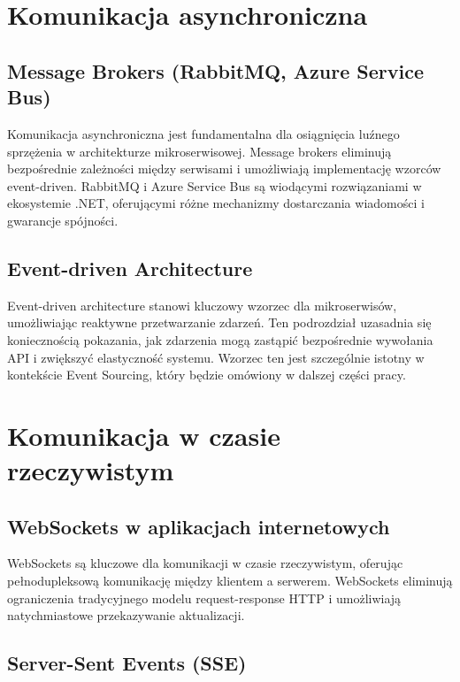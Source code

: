 \section{Komunikacja asynchroniczna}
\label{sec:KomunikacjaAsynchroniczna}

\subsection{Message Brokers (RabbitMQ, Azure Service Bus)}
\label{subsec:MessageBrokers}

Komunikacja asynchroniczna jest fundamentalna dla osiągnięcia luźnego sprzężenia w architekturze mikroserwisowej. Message brokers eliminują bezpośrednie zależności między serwisami i umożliwiają implementację wzorców event-driven. RabbitMQ i Azure Service Bus są wiodącymi rozwiązaniami w ekosystemie .NET, oferującymi różne mechanizmy dostarczania wiadomości i gwarancje spójności.

\subsection{Event-driven Architecture}
\label{subsec:EventDrivenArchitecture}

Event-driven architecture stanowi kluczowy wzorzec dla mikroserwisów, umożliwiając reaktywne przetwarzanie zdarzeń. Ten podrozdział uzasadnia się koniecznością pokazania, jak zdarzenia mogą zastąpić bezpośrednie wywołania API i zwiększyć elastyczność systemu. Wzorzec ten jest szczególnie istotny w kontekście Event Sourcing, który będzie omówiony w dalszej części pracy.

\section{Komunikacja w czasie rzeczywistym}
\label{sec:KomunikacjaCzasRzeczywisty}

\subsection{WebSockets w aplikacjach internetowych}
\label{subsec:WebSockets}

WebSockets są kluczowe dla komunikacji w czasie rzeczywistym, oferując pełnodupleksową komunikację między klientem a serwerem. WebSockets eliminują ograniczenia tradycyjnego modelu request-response HTTP i umożliwiają natychmiastowe przekazywanie aktualizacji.

\subsection{Server-Sent Events (SSE)}
\label{subsec:ServerSentEvents}


